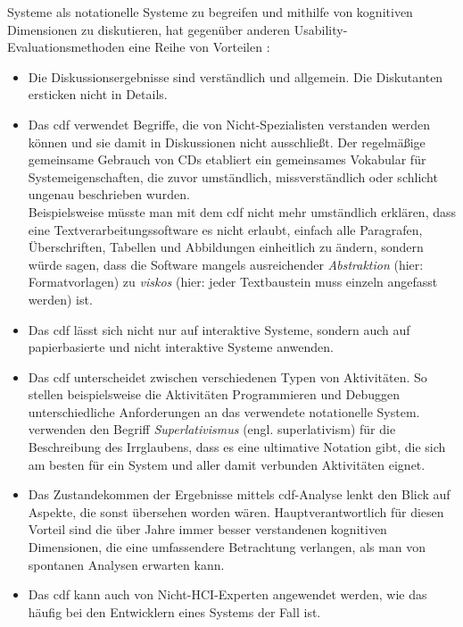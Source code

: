 \begin{important}
Systeme als notationelle Systeme zu begreifen und mithilfe von kognitiven Dimensionen zu diskutieren, hat gegenüber anderen Usability-Evaluationsmethoden eine Reihe von Vorteilen \citep{Green:1989wb,Green:1996gm,AnIntroductiontot:1996ux,GreenCognitive,carroll2003hci}:
\begin{itemize}
\item Die Diskussionsergebnisse sind verständlich und allgemein. Die Diskutanten ersticken nicht in Details.
\item Das \gls{cdf} verwendet Begriffe, die von Nicht-Spezialisten verstanden werden können und sie damit in Diskussionen nicht ausschließt. Der regelmäßige gemeinsame Gebrauch von CDs etabliert ein gemeinsames Vokabular für Systemeigenschaften, die zuvor umständlich, missverständlich oder schlicht ungenau beschrieben wurden.\\Beispielsweise müsste man mit dem \gls{cdf} nicht mehr umständlich erklären, dass eine Textverarbeitungssoftware es nicht erlaubt, einfach alle Paragrafen, Überschriften, Tabellen und Abbildungen einheitlich zu ändern, sondern würde sagen, dass die Software mangels ausreichender \emph{Abstraktion} (hier: Formatvorlagen) zu \emph{viskos} (hier: jeder Textbaustein muss einzeln angefasst werden) ist.
\item Das \gls{cdf} lässt sich nicht nur auf interaktive Systeme, sondern auch auf papierbasierte und nicht interaktive Systeme anwenden. 
\item Das \gls{cdf} unterscheidet zwischen verschiedenen Typen von Aktivitäten. So stellen beispielsweise die Aktivitäten Programmieren und Debuggen unterschiedliche Anforderungen an das verwendete notationelle System. \cite{green1991comprehensibility} verwenden den Begriff \emph{Superlativismus} (engl. superlativism) für die Beschreibung des Irrglaubens, dass es eine ultimative Notation gibt, die sich am besten für ein System und aller damit verbunden Aktivitäten eignet.
\item Das Zustandekommen der Ergebnisse mittels \gls{cdf}-Analyse lenkt den Blick auf Aspekte, die sonst übersehen worden wären. Hauptverantwortlich für diesen Vorteil sind die über Jahre immer besser verstandenen kognitiven Dimensionen, die eine umfassendere Betrachtung verlangen, als man von spontanen Analysen erwarten kann.
\item Das \gls{cdf} kann auch von Nicht-HCI-Experten angewendet werden, wie das häufig bei den Entwicklern eines Systems der Fall ist.
\end{itemize}


\end{important}
